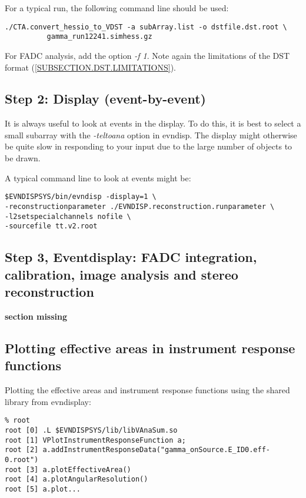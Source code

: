 \documentclass[titlepage,a4paper,twoside,11pt]{report}
\begin{document}
For a typical run, the following command line should be used:

\begin{lstlisting}
./CTA.convert_hessio_to_VDST -a subArray.list -o dstfile.dst.root \ 
          gamma_run12241.simhess.gz  
\end{lstlisting}

For FADC analysis, add the option {\it -f 1}. Note again the limitations of the DST format (\ref{SUBSECTION.DST.LIMITATIONS}).

\subsection{Step 2: Display (event-by-event)}

It is always useful to look at events in the display. 
To do this, it is best to select a small subarray with the {\it -teltoana} option in evndisp.
The display might otherwise be quite slow in responding to your input due to the large number of objects to be drawn.

A typical command line to look at events might be:

\begin{lstlisting}
$EVNDISPSYS/bin/evndisp -display=1 \
-reconstructionparameter ./EVNDISP.reconstruction.runparameter \
-l2setspecialchannels nofile \
-sourcefile tt.v2.root 
\end{lstlisting}

\subsection{Step 3, Eventdisplay: FADC integration, calibration, image analysis and stereo reconstruction}

{\bf section missing}


\subsection{Plotting effective areas in instrument response functions}
\label{SEC.PLOTEFFAREA}

Plotting the effective areas and instrument response functions using
the shared library from evndisplay: 

\begin{lstlisting}
% root
root [0] .L $EVNDISPSYS/lib/libVAnaSum.so
root [1] VPlotInstrumentResponseFunction a;
root [2] a.addInstrumentResponseData("gamma_onSource.E_ID0.eff-0.root")
root [3] a.plotEffectiveArea()
root [4] a.plotAngularResolution()
root [5] a.plot...
\end{lstlisting}
\end{document}
